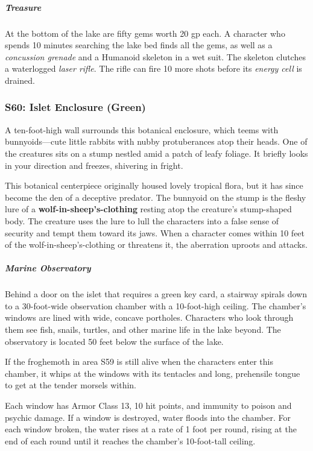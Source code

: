 \documentclass[10pt,a4paper,twoside,bg=print,twocolumn,openany,nodeprecatedcode]{dndbook}
\begin{document}
\subparagraph{Treasure}
At the bottom of the lake are fifty gems worth 20 gp each. A character who spends 10 minutes searching the lake bed finds all the gems, as well as a \textit{concussion grenade} and a Humanoid skeleton in a wet suit. The skeleton clutches a waterlogged \textit{laser rifle}. The rifle can fire 10 more shots before its \textit{energy cell} is drained.

\subsubsection{S60: Islet Enclosure (Green)}
\begin{DndReadAloud}{}
A ten-foot-high wall surrounds this botanical enclosure, which teems with bunnyoids—cute little rabbits with nubby protuberances atop their heads. One of the creatures sits on a stump nestled amid a patch of leafy foliage. It briefly looks in your direction and freezes, shivering in fright.

\end{DndReadAloud}

This botanical centerpiece originally housed lovely tropical flora, but it has since become the den of a deceptive predator. The bunnyoid on the stump is the fleshy lure of a \textbf{wolf-in-sheep's-clothing} resting atop the creature's stump-shaped body. The creature uses the lure to lull the characters into a false sense of security and tempt them toward its jaws. When a character comes within 10 feet of the wolf-in-sheep's-clothing or threatens it, the aberration uproots and attacks.

\subparagraph{Marine Observatory}
Behind a door on the islet that requires a green key card, a stairway spirals down to a 30-foot-wide observation chamber with a 10-foot-high ceiling. The chamber's windows are lined with wide, concave portholes. Characters who look through them see fish, snails, turtles, and other marine life in the lake beyond. The observatory is located 50 feet below the surface of the lake.

If the froghemoth in area S59 is still alive when the characters enter this chamber, it whips at the windows with its tentacles and long, prehensile tongue to get at the tender morsels within.

Each window has Armor Class 13, 10 hit points, and immunity to poison and psychic damage. If a window is destroyed, water floods into the chamber. For each window broken, the water rises at a rate of 1 foot per round, rising at the end of each round until it reaches the chamber's 10-foot-tall ceiling.
\end{document}
